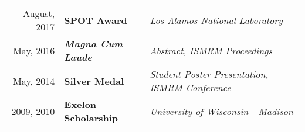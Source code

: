 
\begin{minipage}{\textwidth}
\begin{tabular}{r|ll}
	August, 2017 &	\textbf{SPOT Award} & \textit{Los Alamos National Laboratory} \\
	May, 2016 & \textit{\textbf{Magna Cum Laude}} & \textit{Abstract, ISMRM Proceedings} \\
	May, 2014 & \textbf{Silver Medal} & \textit{Student Poster Presentation, ISMRM Conference} \\
	2009, 2010 & \textbf{Exelon Scholarship} & \textit{University of Wisconsin - Madison} \\
\end{tabular}
\end{minipage}
